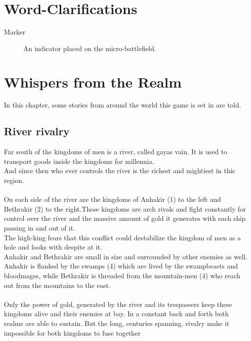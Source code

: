 \documentclass[a5paper,pagesize,10pt,bibtotoc,pointlessnumbers,
normalheadings,DIV=9,twoside=false]{scrbook}
\begin{document}
\chapter{Word-Clarifications}

\begin{description}
\item[Marker]
An indicator placed on the micro-battlefield.
\end{description}


\chapter{Whispers from the Realm}

In this chapter, some stories from around the world this game is set in are told.

\section{River rivalry}

Far south of the kingdoms of men is a river, called gayas vain. It is used to transport goods inside the kingdoms for millennia.\\
And since then who ever controls the river is the richest and mightiest in this region.\\
\\
On each side of the river are the kingdoms of Anhakir (1) to the left and Bethrakir (2) to the right.These kingdoms are arch rivals and fight constantly for control over the river and the massive amount of gold it generates with each ship passing in and out of it.\\
The high-king fears that this conflict could destabilize the kingdom of men as a hole and looks with despite at it.\\
Anhakir and Bethrakir are small in size and surrounded by other enemies as well.\\
Anhakir is flanked by the swamps (4) which are lived by the swampbeasts and bloodmages, while Bethrakir is threaded from the mountain-men (4) who reach out from the mountains to the east.\\
\\
Only the power of gold, generated by the river and its trespassers keep these kingdoms alive and their enemies at bay. In a constant back and forth both realms are able to sustain. But the long, centuries spanning, rivalry make it impossible for both kingdoms to fuse together
\end{document}
